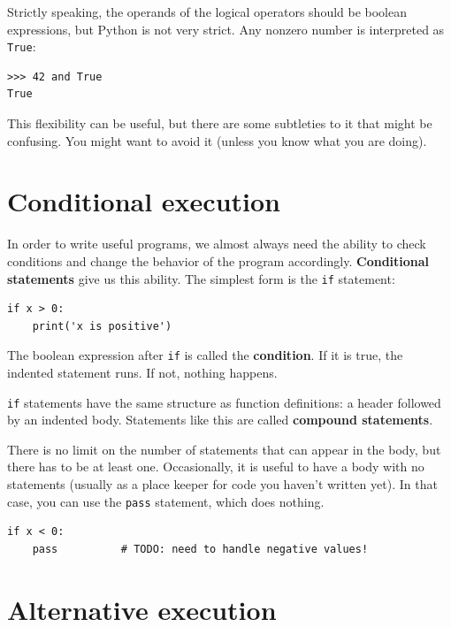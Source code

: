 \documentclass[10pt]{book}
\begin{document}
Strictly speaking, the operands of the logical operators should be
boolean expressions, but Python is not very strict.
Any nonzero number is interpreted as {\tt True}:

\begin{verbatim}
>>> 42 and True
True
\end{verbatim}
%
This flexibility can be useful, but there are some subtleties to
it that might be confusing.  You might want to avoid it (unless
you know what you are doing).


\section{Conditional execution}
\label{conditional.execution}

In order to write useful programs, we almost always need the ability
to check conditions and change the behavior of the program
accordingly.  {\bf Conditional statements} give us this ability.  The
simplest form is the {\tt if} statement:

\begin{verbatim}
if x > 0:
    print('x is positive')
\end{verbatim}
%
The boolean expression after {\tt if} is
called the {\bf condition}.  If it is true, the indented
statement runs.  If not, nothing happens.

{\tt if} statements have the same structure as function definitions:
a header followed by an indented body.  Statements like this are
called {\bf compound statements}.

There is no limit on the number of statements that can appear in
the body, but there has to be at least one.
Occasionally, it is useful to have a body with no statements (usually
as a place keeper for code you haven't written yet).  In that
case, you can use the {\tt pass} statement, which does nothing.

\begin{verbatim}
if x < 0:
    pass          # TODO: need to handle negative values!
\end{verbatim}
%

\section{Alternative execution}
\label{alternative.execution}
\end{document}
